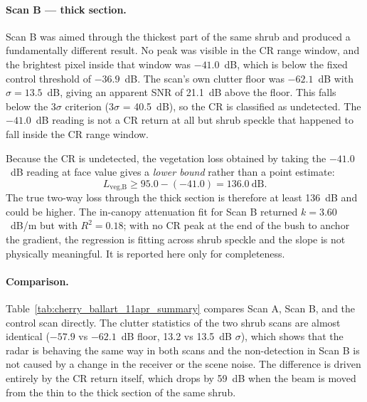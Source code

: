 \paragraph{Scan B --- thick section.}
Scan B was aimed through the thickest part of the same shrub and produced a fundamentally different result. No peak was visible in the CR range window, and the brightest pixel inside that window was $-41.0$~dB, which is below the fixed control threshold of $-36.9$~dB. The scan's own clutter floor was $-62.1$~dB with $\sigma = 13.5$~dB, giving an apparent SNR of 21.1~dB above the floor. This falls below the 3$\sigma$ criterion (3$\sigma$ = 40.5~dB), so the CR is classified as undetected. The $-41.0$~dB reading is not a CR return at all but shrub speckle that happened to fall inside the CR range window.

Because the CR is undetected, the vegetation loss obtained by taking the $-41.0$~dB reading at face value gives a \emph{lower bound} rather than a point estimate:
\begin{equation}
    L_{\text{veg,B}} \geq 95.0 - (-41.0) = 136.0~\text{dB}.
\end{equation}
The true two-way loss through the thick section is therefore at least 136~dB and could be higher. The in-canopy attenuation fit for Scan B returned $k = 3.60$~dB/m but with $R^2 = 0.18$; with no CR peak at the end of the bush to anchor the gradient, the regression is fitting across shrub speckle and the slope is not physically meaningful. It is reported here only for completeness.

\paragraph{Comparison.}
Table~\ref{tab:cherry_ballart_11apr_summary} compares Scan A, Scan B, and the control scan directly. The clutter statistics of the two shrub scans are almost identical ($-57.9$ vs $-62.1$~dB floor, 13.2 vs 13.5~dB $\sigma$), which shows that the radar is behaving the same way in both scans and the non-detection in Scan B is not caused by a change in the receiver or the scene noise. The difference is driven entirely by the CR return itself, which drops by 59~dB when the beam is moved from the thin to the thick section of the same shrub.

